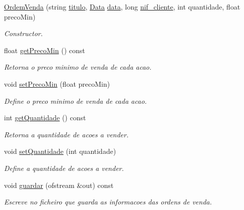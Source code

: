 \begin{DoxyCompactItemize}
\item 
\hyperlink{class_ordem_venda_a90290893a4a714fa7e1b15801a00a452}{Ordem\+Venda} (string \hyperlink{class_ordem_a0773861bd9fb956d5ec62f2ef1de658b}{titulo}, \hyperlink{class_data}{Data} \hyperlink{class_ordem_a9f4dbc2966e98dcbd7e300ae346d8535}{data}, long \hyperlink{class_ordem_af6d06b4250735ae531bdcef5fa332f02}{nif\+\_\+cliente}, int quantidade, float preco\+Min)
\begin{DoxyCompactList}\small\item\em Constructor. \end{DoxyCompactList}\item 
float \hyperlink{class_ordem_venda_a4ebbecbc2fabdeb2f9e6af44c47bd176}{get\+Preco\+Min} () const
\begin{DoxyCompactList}\small\item\em Retorna o preco minimo de venda de cada acao. \end{DoxyCompactList}\item 
void \hyperlink{class_ordem_venda_a5b1ae919558cb5cd7bc892e505abf630}{set\+Preco\+Min} (float preco\+Min)
\begin{DoxyCompactList}\small\item\em Define o preco minimo de venda de cada acao. \end{DoxyCompactList}\item 
int \hyperlink{class_ordem_venda_a0c87b42f245049a1b01f414e508b5692}{get\+Quantidade} () const
\begin{DoxyCompactList}\small\item\em Retorna a quantidade de acoes a vender. \end{DoxyCompactList}\item 
void \hyperlink{class_ordem_venda_a44040292fc692df291cc909d486031de}{set\+Quantidade} (int quantidade)
\begin{DoxyCompactList}\small\item\em Define a quantidade de acoes a vender. \end{DoxyCompactList}\item 
void \hyperlink{class_ordem_venda_a3d6f78188308caac122209e68287e09f}{guardar} (ofstream \&out) const
\begin{DoxyCompactList}\small\item\em Escreve no ficheiro que guarda as informacoes das ordens de venda. \end{DoxyCompactList}\end{DoxyCompactItemize}
